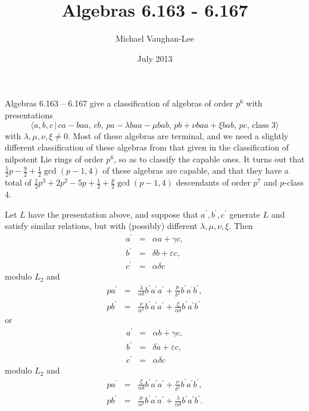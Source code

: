 \documentclass[12pt]{article}
\begin{document}
\title{Algebras 6.163 - 6.167}
\author{Michael Vaughan-Lee}
\date{July 2013}
\maketitle

Algebras 6.163 -- 6.167 give a classification of algebras of order $p^{6}$
with presentations 
\[
\langle a,b,c\,|\,ca-baa,\,cb,\,pa-\lambda baa-\mu bab,\,pb+\nu baa+\xi
bab,\,pc,\,\text{class }3\rangle 
\]%
with $\lambda ,\mu ,\nu ,\xi \neq 0$. Most of these algebras are terminal,
and we need a slightly different classification of these algebras from that
given in the classification of nilpotent Lie rings of order $p^{6}$, so as
to classify the capable ones. It turns out that $\frac{5}{2}p-\frac{9}{2}+%
\frac{1}{2}\gcd (p-1,4)$ of these algebras are capable, and that they have a
total of $\frac{1}{2}p^{3}+2p^{2}-5p+\frac{1}{2}+\frac{p}{2}\gcd (p-1,4)$
descendants of order $p^{7}$ and $p$-class 4.

Let $L$ have the presentation above, and suppose that $a^{\prime },b^{\prime
},c^{\prime }$ generate $L$ and satisfy similar relations, but with
(possibly) different $\lambda ,\mu ,\nu ,\xi $. Then 
\begin{eqnarray*}
a^{\prime } &=&\alpha a+\gamma c, \\
b^{\prime } &=&\delta b+\varepsilon c, \\
c^{\prime } &=&\alpha \delta c
\end{eqnarray*}%
modulo $L_{2}$ and 
\begin{eqnarray*}
pa^{\prime } &=&\frac{\lambda }{\alpha \delta }b^{\prime }a^{\prime
}a^{\prime }+\frac{\mu }{\delta ^{2}}b^{\prime }a^{\prime }b^{\prime }, \\
pb^{\prime } &=&\frac{\nu }{\alpha ^{2}}b^{\prime }a^{\prime }a^{\prime }+%
\frac{\xi }{\alpha \delta }b^{\prime }a^{\prime }b^{\prime }
\end{eqnarray*}%
or 
\begin{eqnarray*}
a^{\prime } &=&\alpha b+\gamma c, \\
b^{\prime } &=&\delta a+\varepsilon c, \\
c^{\prime } &=&\alpha \delta c
\end{eqnarray*}%
modulo $L_{2}$ and 
\begin{eqnarray*}
pa^{\prime } &=&\frac{\xi }{\alpha \delta }b^{\prime }a^{\prime }a^{\prime }+%
\frac{\nu }{\delta ^{2}}b^{\prime }a^{\prime }b^{\prime }, \\
pb^{\prime } &=&\frac{\mu }{\alpha ^{2}}b^{\prime }a^{\prime }a^{\prime }+%
\frac{\lambda }{\alpha \delta }b^{\prime }a^{\prime }b^{\prime }.
\end{eqnarray*}
\end{document}
